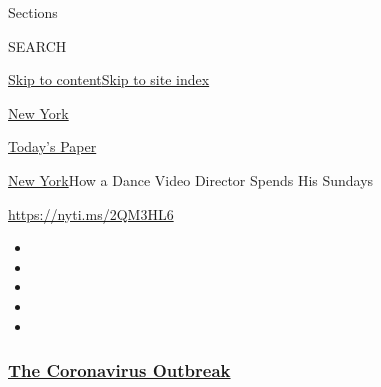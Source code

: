 Sections

SEARCH

\protect\hyperlink{site-content}{Skip to
content}\protect\hyperlink{site-index}{Skip to site index}

\href{https://www.nytimes3xbfgragh.onion/section/nyregion}{New York}

\href{https://myaccount.nytimes3xbfgragh.onion/auth/login?response_type=cookie\&client_id=vi}{}

\href{https://www.nytimes3xbfgragh.onion/section/todayspaper}{Today's
Paper}

\href{/section/nyregion}{New York}\textbar{}How a Dance Video Director
Spends His Sundays

\url{https://nyti.ms/2QM3HL6}

\begin{itemize}
\item
\item
\item
\item
\item
\end{itemize}

\hypertarget{the-coronavirus-outbreak}{%
\subsubsection{\texorpdfstring{\href{https://www.nytimes3xbfgragh.onion/news-event/coronavirus?name=styln-coronavirus-national\&region=TOP_BANNER\&block=storyline_menu_recirc\&action=click\&pgtype=Article\&impression_id=3e65c860-f52e-11ea-aab9-5d05d5926c06\&variant=undefined}{The
Coronavirus
Outbreak}}{The Coronavirus Outbreak}}\label{the-coronavirus-outbreak}}

